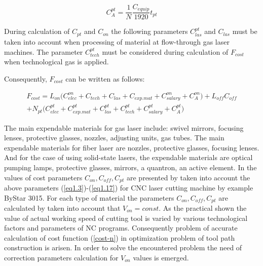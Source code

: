 \documentclass[runningheads]{llncs}
\begin{document}
\begin{equation}
  \label{eq1.17}
  C^{pt}_A = \frac{1}N \frac{C_{equip}}{1920} t_{pt}
\end{equation}

During calculation of $C_{pt}$
and $C_{on}$
the following parameters $C^{pt}_{las}$
and $C_{las}$ must be taken into account
when processing of material at flow-through gas laser machines.
The parameter $C^{pt}_{tech}$
must be considered during calculation of $F_{cost}$
when technological gas is applied.

Consequently,
$F_{cost}$
can be written as follows:

\begin{multline}
  \label{eq1.18}
  F_{cost}
  = L_{on} \Big(
    C^{on}_{elec} + C_{tech} + C_{las} + C_{exp.mat} + C^{on}_{salary} + C^{on}_A
    \Big)
  + L_{off} C_{off} \\
  + N_{pt} \Big(
    C^{pt}_{elec} + C^{pt}_{exp.mat} + C^{pt}_{las} + C^{pt}_{tech} + C^{pt}_{salary} + C^{pt}_A
    \Big)
\end{multline}

The main expendable materials for gas laser include:
swivel mirrors, focusing lenses, protective glasses, nozzles, adjusting units, gas tubes.
The main expendable materials for fiber laser are nozzles, protective glasses, focusing lenses.
And for the case of using solid-state lasers,
the expendable materials are
optical pumping lamps, protective glasses, mirrors, a quantron, an active element.
In \cite{ru14} the values of cost parameters
$C_{on}, C_{off}, C_{pt}$
are presented by taken into account the above parameters
(\ref{eq1.3})-(\ref{eq1.17})
for CNC laser cutting machine by example ByStar 3015.
For each type of material the parameters
$C_{on}, C_{off}, C_{pt}$
are calculated by taken into account that
$V_{on}=const$.
As the practical shown \cite{ru09,Tavaeva2015Nov}
the value of actual working speed of cutting tool
is varied by various technological factors and parameters of NC programs.
Consequently problem of accurate calculation of cost function (\ref{cost-n})
in optimization problem of tool path construction is arisen.
In order to solve the encountered problem
the need of correction parameters calculation for $V_{on}$
values is emerged.
\end{document}
